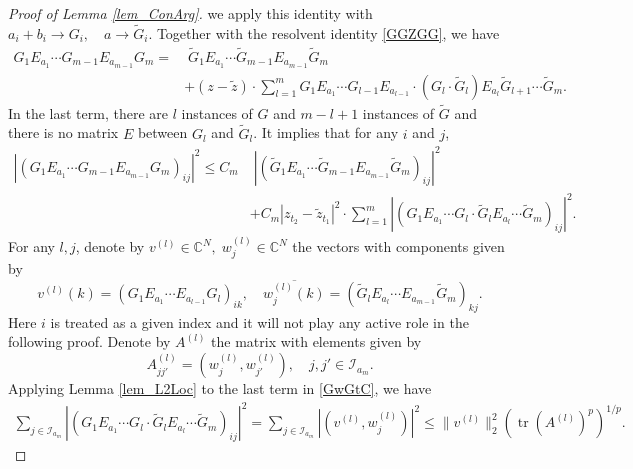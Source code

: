 \documentclass[10pt,reqno]{article}
\theoremstyle{plain} %
\theoremstyle{remark}
\numberwithin{equation}{section}
\begin{document}
\begin{proof}[Proof of Lemma \ref{lem_ConArg}]
we apply this identity with $  a_i+b_i\to G_i,\quad a\to \widetilde{G}_i$.
Together with  the resolvent identity \eqref{GGZGG}, we have
\begin{align}
        G_1 E_{a_1} \cdots G_{m-1} E_{a_{m-1}} G_m = & \; \widetilde{G}_1 E_{a_1} \cdots \widetilde{G}_{m-1} E_{a_{m-1}} \widetilde{G}_m 
        \nonumber \\
        & + (z - \widetilde{z}) \cdot \sum_{l=1}^m G_1 E_{a_1} \cdots G_{l-1} E_{a_{l-1}} \cdot \left( G_l \cdot \widetilde{G}_l\right)
        E_{a_l} \widetilde{G}_{l+1} \cdots \widetilde{G}_m.
\end{align}
In the last term, there are \( l \) instances of \( G \) and \( m - l + 1 \) instances of \( \widetilde{G} \)
and there is no matrix $E$ between $G_l$ and $\widetilde{G}_l$. 
It implies that for any $i$ and $j$,
    \begin{align}\label{GwGtC}
        \left| \left( G_1 E_{a_1} \cdots G_{m-1} E_{a_{m-1}} G_m \right)_{ij} \right|^2 \le C_m & \;
        \left| \left( \widetilde{G}_1 E_{a_1} \cdots \widetilde{G}_{m-1} E_{a_{m-1}} \widetilde{G}_m \right)_{ij} \right|^2 \nonumber \\
        & + C_m \left|z_{t_2} - \widetilde{z}_{t_1}\right|^2 \cdot \sum_{l=1}^m \left| \left( G_1 E_{a_1} \cdots G_l \cdot \widetilde{G}_l E_{a_l} \cdots \widetilde{G}_m \right)_{ij} \right|^2.
    \end{align}
For any  $l, j$, denote by $ v^{(l)} \in \mathbb C^{N}, \; w^{(l)}_j\in \mathbb C^{N}$  the vectors with components given by  
$$
    v^{(l)}(k) = \left( G_1 E_{a_1} \cdots E_{a_{l-1}} G_l \right)_{ik}, \quad 
   \overline{  w^{(l)}_j(k)} = \left( \widetilde{G}_l E_{a_l} \cdots E_{a_{m-1}} \widetilde{G}_m \right)_{kj}.
$$
Here $i$ is treated as a given  index and it will not play any active role in the following proof. Denote by  $A^{(l)}$   the matrix with  elements given by 
$$
    A^{(l)}_{jj'} = \left( w^{(l)}_j, w^{(l)}_{j'} \right), \quad j, j' \in \mathcal{I}_{a_m}.
$$
Applying Lemma \ref{lem_L2Loc} to the last term in \eqref{GwGtC}, we have 
\begin{align}\label{jziwmas}
      \sum_{j \in \mathcal{I}_{a_m}} \left| \left( G_1 E_{a_1} \cdots G_l \cdot \widetilde{G}_l E_{a_l} \cdots \widetilde{G}_m \right)_{ij} \right|^2
    = \sum_{j \in \mathcal{I}_{a_m}} \left| \left( v^{(l)}, w^{(l)}_j \right)\right|^2
    \le \|v^{(l)}\|_2^2 \left( \operatorname{tr} \left( A^{(l)} \right)^p \right)^{1/p}.  
\end{align}
 

\end{proof}
\end{document}
